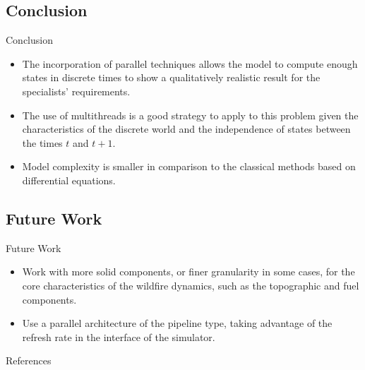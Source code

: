 \documentclass{beamer}
\begin{document}
        \subsection{Conclusion}
        \begin{frame}{Conclusion}
            \begin{itemize}
                \item<1-> The incorporation of parallel techniques allows the model to compute enough 
                    states in discrete times to show a qualitatively realistic result for the specialists' requirements.
                \item<2-> The use of multithreads is a good strategy to apply to this problem given 
                    the characteristics of the discrete world and the independence of states between the 
                    times $t$ and $t + 1$.
                \item<3-> Model complexity is smaller in comparison to the classical methods based on differential 
                    equations.
            \end{itemize}
        \end{frame}
        
        \subsection{Future Work}
        \begin{frame}{Future Work}
            \begin{itemize}
                \item<1-> Work with more solid components, or finer granularity in some cases, for the core 
                    characteristics of the wildfire dynamics, such as the topographic and fuel components.
                \item<2-> Use a parallel architecture of the pipeline type, taking advantage of the refresh 
                    rate in the interface of the simulator.
            \end{itemize}
        \end{frame}
        
    \begin{frame}[allowframebreaks]{References}
        
        
    \end{frame}
     
\end{document}
